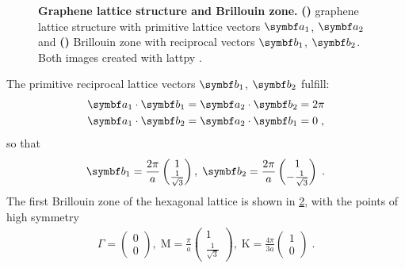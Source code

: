 \documentclass[../main.tex]{subfiles}
\begin{document}
\begin{figure}[tb]
	\centering
	\begin{subfigure}[t]{0.5\textwidth}
		\centering
		\caption{\hfill\null}\label{sfig:graphene lattice structure}
		
	\end{subfigure}%
	\begin{subfigure}[t]{0.5\textwidth}
		\centering
		\caption{\hfill\null}\label{sfig:graphene Brillouin zone}
		
	\end{subfigure}
	\caption[Graphene lattice structure and Brillouin zone.]{\textbf{Graphene lattice structure and Brillouin zone.} \textbf{()} graphene lattice structure with primitive lattice vectors \(\vb{a}_1\), \(\vb{a}_2\) and \textbf{()} Brillouin zone with reciprocal vectors \(\vb{b}_1\), \(\vb{b}_2\). Both images created with lattpy \cite{Jones_lattpy_2022}.}
	\label{fig:graphene lattice structure and Brilluoin zone}
\end{figure}
The primitive reciprocal lattice vectors \(\vb{b}_1\), \(\vb{b}_2\) fulfill:
\begin{align}
	\vb{a}_1 \cdot \vb{b}_1 &= \vb{a}_2 \cdot \vb{b}_2 = 2\pi \\
	\vb{a}_1 \cdot \vb{b}_2 &= \vb{a}_2 \cdot \vb{b}_1 = 0\;,
\end{align}
so that
\begin{align}
	\vb{b}_1 = \frac{2\pi}{a} \begin{pmatrix} 1 \\ \frac{1}{\sqrt{3}} \end{pmatrix},\;
	\vb{b}_2 = \frac{2\pi}{a} \begin{pmatrix} 1 \\ - \frac{1}{\sqrt{3}} \end{pmatrix} \;.
\end{align}
The first Brillouin zone of the hexagonal lattice is shown in \cref{sfig:graphene Brillouin zone}, with the points of high symmetry
\begin{align}
	\Gamma = \begin{pmatrix} 0 \\ 0 \end{pmatrix},\;
	\mathrm{M} = \frac{\pi}{a} \begin{pmatrix} 1 \\ \frac{1}{\sqrt{3}} \end{pmatrix},\;
	\mathrm{K} = \frac{4\pi}{3 a} \begin{pmatrix} 1 \\ 0 \end{pmatrix}\;.
\end{align}
\end{document}
